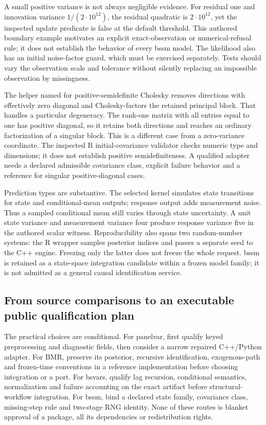 A small positive variance is not always negligible evidence. For residual one and innovation variance $1/(2\cdot10^{12})$, the residual quadratic is $2\cdot10^{12}$, yet the inspected update predicate is false at the default threshold. This authored boundary example motivates an explicit exact-observation or numerical-refusal rule; it does not establish the behavior of every bssm model. The likelihood also has an initial noise-factor guard, which must be exercised separately. Tests should vary the observation scale and tolerance without silently replacing an impossible observation by missingness.~\citep{exec25_cdyn_bssm,exec25_cdyn_choice}

The helper named for positive-semidefinite Cholesky removes directions with effectively zero diagonal and Cholesky-factors the retained principal block. That handles a particular degeneracy. The rank-one matrix with all entries equal to one has positive diagonal, so it retains both directions and reaches an ordinary factorization of a singular block. This is a different case from a zero-variance coordinate. The inspected R initial-covariance validator checks numeric type and dimensions; it does not establish positive semidefiniteness. A qualified adapter needs a declared admissible covariance class, explicit failure behavior and a reference for singular positive-diagonal cases.~\citep{exec25_cdyn_bssm,exec25_cdyn_choice}

Prediction types are substantive. The selected kernel simulates state transitions for state and conditional-mean outputs; response output adds measurement noise. Thus a sampled conditional mean still varies through state uncertainty. A unit state variance and measurement variance four produce response variance five in the authored scalar witness. Reproducibility also spans two random-number systems: the R wrapper samples posterior indices and passes a separate seed to the C++ engine. Freezing only the latter does not freeze the whole request. bssm is retained as a state-space integration candidate within a frozen model family; it is not admitted as a general causal identification service.~\citep{exec25_cdyn_bssm,exec25_cdyn_choice}

\subsection{From source comparisons to an executable public qualification plan}

The practical choices are conditional. For panelvar, first qualify keyed preprocessing and diagnostic fields, then consider a narrow repaired C++/Python adapter. For BMR, preserve its posterior, recursive identification, exogenous-path and frozen-time conventions in a reference implementation before choosing integration or a port. For bsvars, qualify lag recursion, conditional semantics, normalization and failure accounting on the exact artifact before structural-workflow integration. For bssm, bind a declared state family, covariance class, missing-step rule and two-stage RNG identity. None of these routes is blanket approval of a package, all its dependencies or redistribution rights.~\citep{exec25_cdyn_choice}

